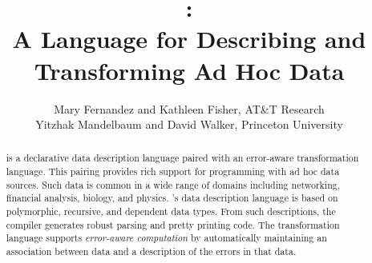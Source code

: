 \documentclass{article}
\begin{document}







  \title{\datatype{}: \\ A Language for Describing and Transforming Ad Hoc Data} 

\author{Mary Fernandez and
     Kathleen Fisher, AT\&T Research\\ 
    Yitzhak Mandelbaum and  David Walker, Princeton University}


\maketitle

\begin{abstract}
\datatype{} is a declarative data description language paired with an 
error-aware transformation language.  This pairing provides rich support for
programming with ad hoc data sources.  Such data is common in a wide range of domains including networking, financial analysis, biology, and physics.
\datatype{}'s data description language is based on polymorphic, recursive, and dependent data types.  From such descriptions, the compiler generates robust parsing and pretty printing code. The transformation language supports \textit{error-aware computation} by automatically maintaining an association between data and a description of the errors in that data.  
\end{abstract}








%








\newpage

\end{document}
